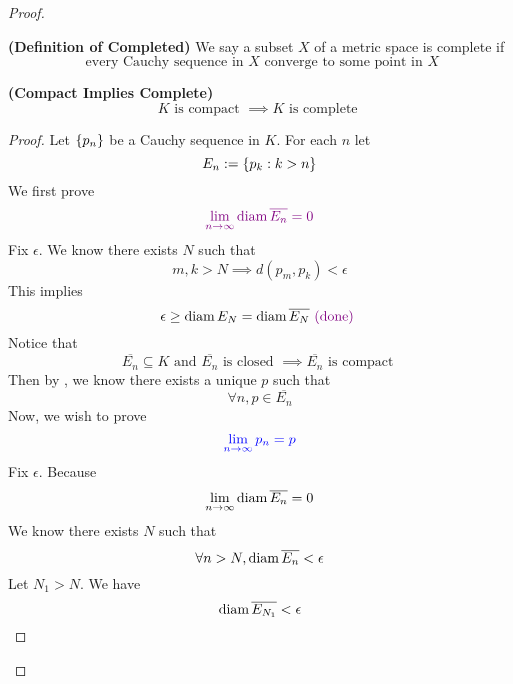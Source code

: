 \documentclass{report}
\begin{document}
\begin{proof}
\begin{definition}
\label{3.9.7}
\textbf{(Definition of Completed)} We say a subset $X$ of a metric space is complete if 
\begin{equation}
\text{ every Cauchy sequence in $X$ converge to some point in $X$}
\end{equation}
\end{definition}
\begin{theorem}
\label{3.9.8}
\textbf{(Compact Implies Complete)} 
\begin{equation}
K\text{ is compact }\implies K\text{ is complete }
\end{equation}
\end{theorem}
\begin{proof}
Let $\{ p_n \}$ be a Cauchy sequence in $K$. For each $n$ let
 \begin{equation}
E_n:=\{ p_k:k> n \}
\end{equation}
We first prove 
\begin{equation}
  \textcolor{violet}{\lim_{n\to\infty}\text{diam}\, \overline{E_n}=0}
\end{equation}
Fix $\epsilon $. We know there exists $N$ such that
 \begin{equation}
m,k>N\implies d(p_m,p_k)<\epsilon 
\end{equation}
This implies
\begin{equation}
\epsilon \geq \text{diam}\, E_N=\text{diam}\, \overline{E_N}\textcolor{violet}{\text{ (done) }}
\end{equation}
Notice that
\begin{equation}
\overline{E_n}\subseteq K\text{ and }\overline{E_n}\text{ is closed }\implies \overline{E_n}\text{ is compact }
\end{equation}
Then by , we know there exists a unique $p$ such that
 \begin{equation}
\forall n, p\in  \overline{E_n}
\end{equation}
Now, we wish to prove
\begin{equation}
  \textcolor{blue}{\lim_{n\to\infty}p_n=p}
\end{equation}
Fix $\epsilon $. Because
\begin{equation} \lim_{n\to\infty}\text{diam}\, \overline{E_n}=0
\end{equation}
We know there exists $N$ such that
 \begin{equation}
\forall n>N, \text{diam}\, \overline{E_n}<\epsilon 
\end{equation}
Let $N_1>N$. We have
 \begin{equation}
\diam{\overline{E_{N_1}}}<\epsilon 

\end{equation}
\end{proof}
\end{proof}
\end{document}
